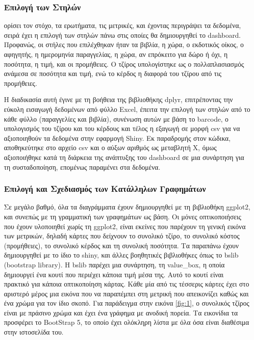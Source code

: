 \documentclass[greek, 12pt]{article}
\begin{document}
\subsubsection{Επιλογή των Στηλών}

 ορίσει τον στόχο, τα ερωτήματα, τις μετρικές, και έχοντας περιγράψει τα δεδομένα, σειρά έχει η επιλογή των στηλών πάνω στις οποίες θα δημιουργηθεί το dashboard. Προφανώς, οι στήλες που επιλέχθηκαν ήταν τα βιβλία, η χώρα, ο εκδοτικός οίκος, ο αφηγητής, η ημερομηνία παραγγελίας, η χώρα, αν επρόκειτο για δώρο ή όχι, η ποσότητα, η τιμή, και οι προμήθειες. Ο τζίρος υπολογίστηκε ως ο πολλαπλασιασμός ανάμεσα σε ποσότητα και τιμή, ενώ το κέρδος η διαφορά του τζίρου από τις προμήθειες.

Η διαδικασία αυτή έγινε με τη βοήθεια της βιβλιοθήκης dplyr, επιτρέποντας την εύκολη εισαγωγή δεδομένων από φύλλο Excel, έπειτα την επιλογή των στηλών από το κάθε φύλλο (παραγγελίες και βιβλία), συνένωση αυτών με βάση το barcode, ο υπολογισμός του τζίρου και του κέρδους και τέλος η εξαγωγή σε μορφή csv για να αξιοποιηθούν τα δεδομένα στην εφαρμογή Shiny. Εκ παραδρομής στον κώδικα, αποθηκεύτηκε στο αρχείο csv και ο αύξων αριθμός ως μεταβλητή Χ, όμως αξιοποιήθηκε κατά τη διάρκεια της ανάπτυξης του dashboard σε μια συνάρτηση για τη συσταδοποίηση, επομένως παραμένει στα δεδομένα.

\subsubsection{Επιλογή και Σχεδιασμός των Κατάλληλων Γραφημάτων}

Σε μεγάλο βαθμό, όλα τα διαγράμματα έχουν δημιουργηθεί με τη βιβλιοθήκη ggplot2, και συνεπώς με τη γραμματική των γραφημάτων ως βάση. Οι μόνες οπτικοποιήσεις που έχουν υλοποιηθεί χωρίς τη ggplot2, είναι εκείνες που παρέχουν τη γενική εικόνα των μετρικών, δηλαδή κάρτες που δείχνουν το συνολικό τζίρο, το συνολικό κόστος (προμήθειες), το συνολικό κέρδος και τη συνολική ποσότητα. Τα παραπάνω έχουν δημιουργηθεί με το ίδιο το shiny, και άλλες βοηθητικές βιβλιοθήκες όπως το bslib (bootstrap library). Η bslib παρέχει μια συνάρτηση, τη value\_box, η οποία δημιουργεί ένα κουτί που περιέχει κάποια τιμή μέσα της. Αυτό το κουτί είναι πρακτικό για κάποια οπτικοποίηση κάρτας. Κάθε μία από τις τέσσερις κάρτες έχει στο αριστερό μέρος μια εικόνα που να παραπέμπει στη μετρική που απεικονίζει καθώς και ένα χρώμα για τον ίδιο σκοπό. Για παράδειγμα στην εικόνα \ref{fig:1}, ο συνολικός τζίρος είναι με πράσινο χρώμα και έχει ένα γράφημα με ανοδική πορεία. Τα εικονίδια τα προσφέρει το BootStrap 5, το οποίο έχει ολόκληρη λίστα με όλα όσα είναι διαθέσιμα στην ιστοσελίδα του.
\end{document}
